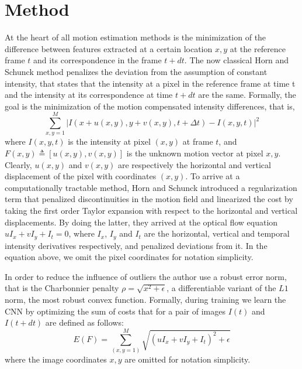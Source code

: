 \documentclass[10pt,twocolumn,letterpaper]{article}
\begin{document}
\section{Method}
At the heart of all motion estimation methods is the minimization of the difference between features extracted at a certain location $x,y$ at the reference frame $t$ and its correspondence in the frame $t
+dt$. The now classical Horn and Schunck method penalizes the deviation from the assumption of constant intensity, that states that the intensity at a pixel in the reference frame at time t and the intensity at its correspondence at time $t+dt$ are the same. Formally, the goal is the minimization of the motion compensated intensity differences, that is,
\begin{equation}
\sum^M_{x,y=1}|I(x+u(x,y),y+v(x,y),t+\Delta t)-I(x,y,t)|^2
\end{equation}
where $I(x,y,t)$ is the intensity at pixel $(x,y)$ at frame $t$, and $F(x,y)\triangleq[u(x,y),v(x,y)]$ is the unknown motion vector at pixel $x,y$. Clearly, $u(x,y)$ and $v(x,y)$ are respectively the horizontal and vertical displacement of the pixel with coordinates $(x,y)$. To arrive at a computationally tractable method, Horn and Schunck introduced a regularization term that penalized discontinuities in the motion field and linearized the cost by taking the first order Taylor expansion with respect to the horizontal and vertical displacements. By doing the latter, they arrived at the optical flow equation $uI_x+vI_y+I_t=0$, where $I_x$, $I_y$ and $I_t$ are the horizontal, vertical and temporal intensity derivatives respectively, and penalized deviations from it\cite{Wang2014Action}. In the equation above, we omit the pixel coordinates for notation simplicity.
\par
In order to reduce the influence of outliers the author use a robust error norm, that is the Charbonnier penalty $\rho=\sqrt{x^2+\epsilon}$, a differentiable variant of the $L1$ norm, the most robust convex function. Formally, during training we learn the CNN by optimizing the sum of costs that for a pair of images $I(t)$ and $I(t+dt)$ are defined as follows:
\begin{equation}
E(F)=\sum^M_(x,y=1)\sqrt{(uI_x+vI_y+I_t)^2+\epsilon}
\end{equation}
where the image coordinates $x,y$ are omitted for notation simplicity.
\end{document}
